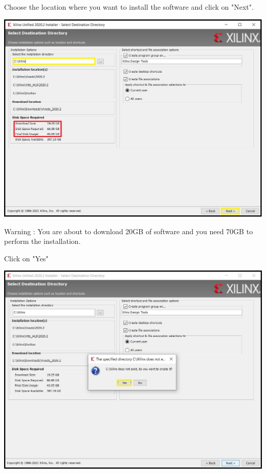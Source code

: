 \begin{minipage}{\linewidth}
  Choose the location where you want to install the software and click on "Next".
  \\
  \begin{center}
    \includegraphics[width=0.7\linewidth]{images/VivadoInstimg014.jpg}
  \end{center}
  Warning : You are about to download 20GB of software and you need 70GB to perform the installation.
\end{minipage}

\begin{minipage}{\linewidth}
  Click on "Yes"
  \\
  \begin{center}
    \includegraphics[width=0.7\linewidth]{images/VivadoInstimg015.jpg}
  \end{center}
\end{minipage}

